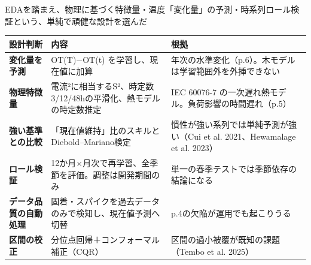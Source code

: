 \documentclass[aspectratio=169,10pt]{beamer}
\begin{document}
\begin{frame}{EDAを踏まえ、物理に基づく特徴量・温度「変化量」の予測・時系列ロール検証という、単純で頑健な設計を選んだ}
  \scriptsize
  \renewcommand{\arraystretch}{1.25}
  \begin{tabularx}{\textwidth}{>{\bfseries}p{3.0cm} X X}
    \toprule
    設計判断 & 内容 & 根拠 \\
    \midrule
    変化量を予測 & OT(T)−OT(t) を学習し、現在値に加算 & 年次の水準変化（p.6）。木モデルは学習範囲外を外挿できない \\
    物理特徴量 & 電流²に相当するS²、時定数3/12/48hの平滑化、熱モデルの時定数推定 & IEC 60076-7 の一次遅れ熱モデル。負荷影響の時間遅れ（p.5） \\
    強い基準との比較 & 「現在値維持」比のスキルとDiebold–Mariano検定 & 慣性が強い系列では単純予測が強い（Cui et al. 2021、Hewamalage et al. 2023） \\
    ロール検証 & 12か月×月次で再学習、全季節を評価。調整は開発期間のみ & 単一の春季テストでは季節依存の結論になる \\
    データ品質の自動処理 & 固着・スパイクを過去データのみで検知し、現在値予測へ切替 & p.4の欠陥が運用でも起こりうる \\
    区間の校正 & 分位点回帰＋コンフォーマル補正（CQR） & 区間の過小被覆が既知の課題（Tembo et al. 2025） \\
    \bottomrule
  \end{tabularx}
\end{frame}
\end{document}
